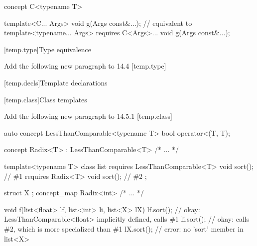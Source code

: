\documentclass[american]{book}
\newcommand{\editorial}[1]{\colorbox{editbackground}{\begin{minipage}{\linewidth
}#1\end{minipage}}}
\begin{document}
\begin{paras}
\begin{codeblock}
concept C<typename T> { }

template<C... Args> void g(Args const&...);
// equivalent to
template<typename... Args> requires C<Args>... void g(Args const&...);
\end{codeblock}
\addedConcepts{\mbox{\exitexample}}

\color{black}

\setcounter{section}{3}
[temp.type]{Type equivalence}
\setcounter{Paras}{1}

\noindent\editorial{Add the following new paragraph to 14.4
  [temp.type]}
\pnum
{}

[temp.decls]{Template declarations}

[temp.class]{Class templates}

\noindent\editorial{Add the following new paragraph to 14.5.1
  [temp.class]}
\setcounter{Paras}{4}
\color{addclr}
\pnum
{}
\begin{codeblock}
auto concept LessThanComparable<typename T> {
  bool operator<(T, T);
}

concept Radix<T> : LessThanComparable<T> { /* ... */ }

template<typename T>
class list {
  requires LessThanComparable<T> void sort(); // \#1
  requires Radix<T> void sort(); // \#2
};

struct X { };
concept_map Radix<int> { /* ... */ }

void f(list<float> lf, list<int> li, list<X> lX) 
{
  lf.sort(); // okay: LessThanComparable<float> implicitly defined, calls \#1
  li.sort(); // okay: calls \#2, which is more specialized than \#1
  lX.sort(); // error: no 'sort' member in list<X>
}
\end{codeblock}
\addedConcepts{\mbox{\exitexample}}
\color{black}


\end{paras}
\end{document}
